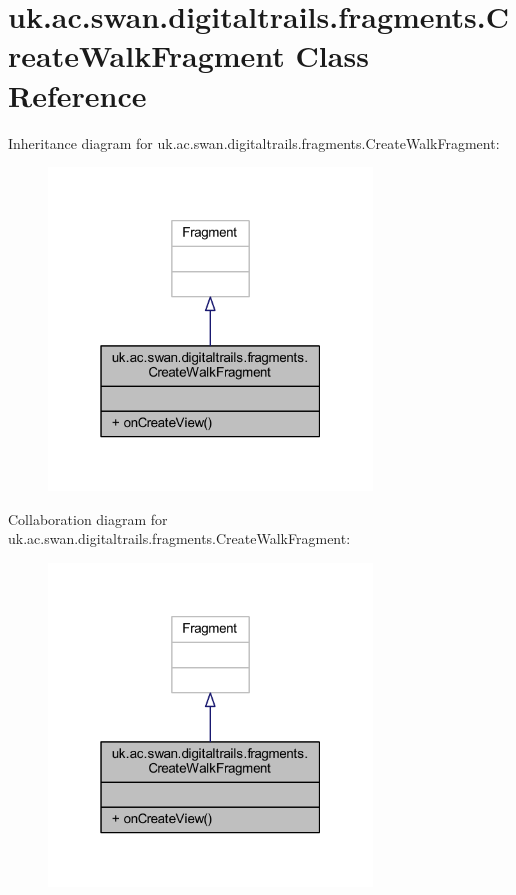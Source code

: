 \hypertarget{classuk_1_1ac_1_1swan_1_1digitaltrails_1_1fragments_1_1_create_walk_fragment}{\section{uk.\+ac.\+swan.\+digitaltrails.\+fragments.\+Create\+Walk\+Fragment Class Reference}
\label{classuk_1_1ac_1_1swan_1_1digitaltrails_1_1fragments_1_1_create_walk_fragment}
}


Inheritance diagram for uk.\+ac.\+swan.\+digitaltrails.\+fragments.\+Create\+Walk\+Fragment\+:
\nopagebreak
\begin{figure}[H]
\begin{center}
\leavevmode
\includegraphics[width=244pt]{classuk_1_1ac_1_1swan_1_1digitaltrails_1_1fragments_1_1_create_walk_fragment__inherit__graph}
\end{center}
\end{figure}


Collaboration diagram for uk.\+ac.\+swan.\+digitaltrails.\+fragments.\+Create\+Walk\+Fragment\+:
\nopagebreak
\begin{figure}[H]
\begin{center}
\leavevmode
\includegraphics[width=244pt]{classuk_1_1ac_1_1swan_1_1digitaltrails_1_1fragments_1_1_create_walk_fragment__coll__graph}
\end{center}
\end{figure}
